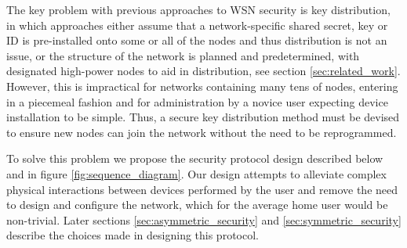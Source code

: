 \documentclass[conference]{./sty/IEEEtran}
\begin{document}
The key problem with previous approaches to WSN security is key distribution, in which approaches either assume that a network-specific shared secret, key or ID is pre-installed onto some or all of the nodes and thus distribution is not an issue, or the structure of the network is planned and predetermined, with designated high-power nodes to aid in distribution, see section \ref{sec:related_work}. However, this is impractical for networks containing many tens of nodes, entering in a piecemeal fashion and for administration by a novice user expecting device installation to be simple. Thus, a secure key distribution method must be devised to ensure new nodes can join the network without the need to be reprogrammed.

To solve this problem we propose the security protocol design described below and in figure \ref{fig:sequence_diagram}. Our design attempts to alleviate complex physical interactions between devices performed by the user\cite{MessageBottle} and remove the need to design and configure the network, which for the average home user would be non-trivial. Later sections \ref{sec:asymmetric_security} and \ref{sec:symmetric_security} describe the choices made in designing this protocol.
\end{document}
